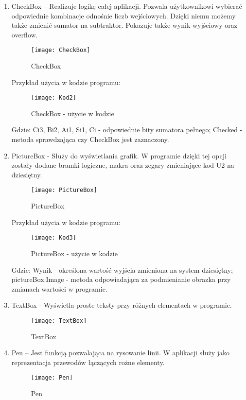 \documentclass[12pt, a4paper, onside, polish]{article}				%
\begin{document}
 \begin{enumerate}
\item CheckBox – Realizuje logikę całej aplikacji. Pozwala użytkownikowi wybierać odpowiednie kombinacje odnośnie liczb wejściowych. Dzięki niemu możemy także zmienić sumator na subtraktor. Pokazuje także wynik wyjściowy oraz overflow. 
   	\begin{figure}[H]
  	  {\centering \texttt{[image: CheckBox]} \caption{CheckBox}}\vspace{5mm}
  	 \end{figure}
Przykład użycia w kodzie programu:
   	\begin{figure}[H]
  	  {\centering \texttt{[image: Kod2]} \caption{CheckBox - użycie w kodzie}}
  	\end{figure}
Gdzie: \newline
Ci3, Bi2, Ai1, Si1, Ci - odpowiednie bity sumatora pełnego; \newline
Checked - metoda sprawdzająca czy CheckBox jest zaznaczony. \newline


\item PictureBox - Służy do wyświetlania grafik. W programie dzięki tej opcji zostały dodane bramki logiczne, makra oraz zegary zmieniające kod U2 na dziesiętny.
   	\begin{figure}[H]
  	  {\centering \texttt{[image: PictureBox]} \caption{PictureBox}}\vspace{5mm}
  	 \end{figure}
Przykład użycia w kodzie programu:
   	\begin{figure}[H]
  	  {\centering \texttt{[image: Kod3]} \caption{PictureBox - użycie w kodzie}}\vspace{5mm}
  	 \end{figure}
Gdzie: \newline
Wynik - określona wartość wyjścia zmieniona na system dziesiętny; \newline
pictureBox.Image - metoda odpowiadająca za podmienianie obrazka przy zmianach wartości w programie. \newline

\item TextBox - Wyświetla proste teksty przy różnych elementach w programie.  \newline
   	\begin{figure}[H]
  	  {\centering \texttt{[image: TextBox]} \caption{TextBox}}\vspace{5mm}
  	 \end{figure}
\item Pen – Jest funkcją pozwalająca na rysowanie linii. W aplikacji służy jako reprezentacja przewodów łączących rożne elementy.  
   	\begin{figure}[H]
  	  {\centering \texttt{[image: Pen]} \caption{Pen}}\vspace{5mm}
  	 \end{figure}


\end{enumerate}
\end{document}
